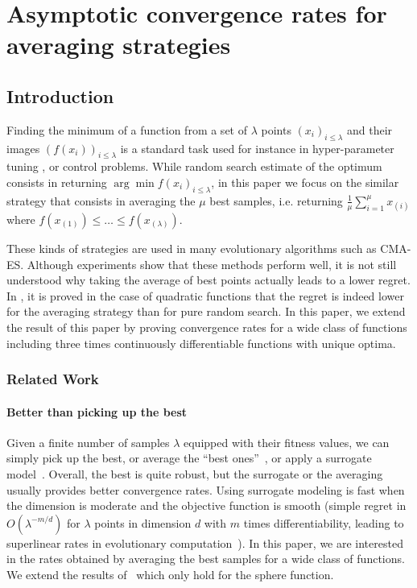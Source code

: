 \chapter{Asymptotic convergence rates for averaging strategies}
\label{paper:foga}
\section{Introduction}
Finding the minimum of a function from a set of $\lambda$ points $(x_i)_{i\leq \lambda}$ and their images $(f(x_i))_{i\leq \lambda}$ is a standard task used for instance in hyper-parameter tuning \cite{bergstra2012random}, or control problems. While random search estimate of the optimum consists in returning $\arg\min f(x_i)_{i\leq \lambda}$, in this paper we focus on the similar strategy that consists in averaging the $\mu$ best samples, i.e. returning $\frac1\mu\sum_{i=1}^\mu x_{(i)}$ where $f(x_{(1)})\leq\ldots\leq f(x_{(\lambda)})$.

These kinds of strategies are used in many evolutionary algorithms such as CMA-ES. Although experiments show that these methods perform well, it is not still understood why taking the average of best points actually leads to a lower regret. In \cite{ppsnkbest}, it is proved in the case of quadratic functions that the regret is indeed lower for the averaging strategy than for pure random search. In this paper, we extend the result of this paper by proving convergence rates for a wide class of functions including three times continuously differentiable functions with unique optima.


\subsection{Related Work}

\subsubsection{Better than picking up the best}
Given a finite number of samples $\lambda$ equipped with their fitness values, we can simply pick up the best, or average the ``best ones''~\cite{beyerbenefitofsex,ppsnkbest}, or apply a surrogate model~\cite{sm1,sm2,sm3,AST,bach}. Overall, the best is quite robust, but the surrogate or the averaging usually provides  better convergence rates. Using surrogate modeling is fast when the dimension is moderate and the objective function is smooth (simple regret in $O(\lambda^{-m/d})$ for $\lambda$ points in dimension $d$ with $m$ times differentiability, leading to superlinear rates in evolutionary computation~\cite{AST}). In this paper, we are interested in the rates obtained by averaging the best samples for a wide class of functions. We extend the results of~\cite{ppsnkbest} which only hold for the sphere function.

